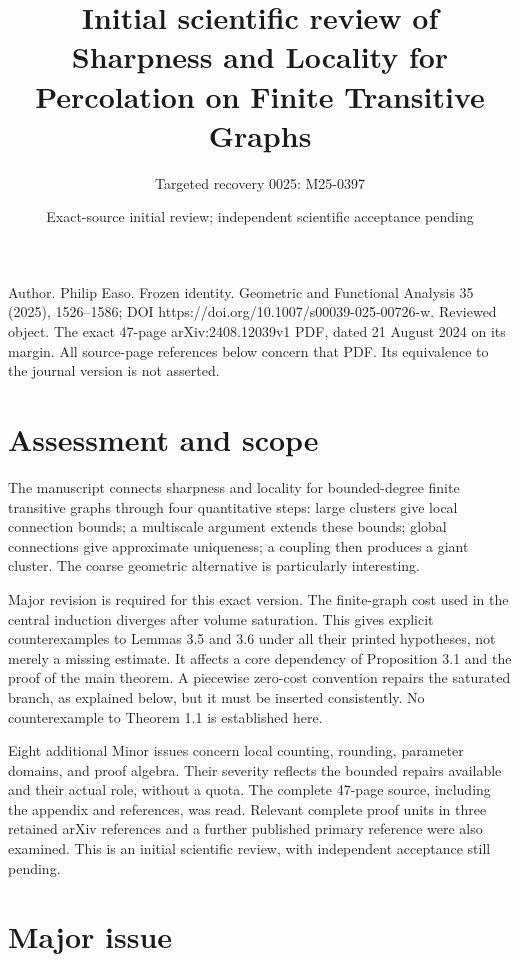 \documentclass[10pt]{article}
\title{Initial scientific review of
Sharpness and Locality for Percolation
on Finite Transitive Graphs}
\author{Targeted recovery 0025: M25-0397}
\date{Exact-source initial review; independent scientific acceptance pending}
\begin{document}
\maketitle
Author. Philip Easo. Frozen identity. Geometric and Functional Analysis 35 (2025), 1526–1586; DOI https://doi.org/10.1007/s00039-025-00726-w. Reviewed object. The exact 47-page arXiv:2408.12039v1 PDF, dated 21 August 2024 on its margin. All source-page references below concern that PDF. Its equivalence to the journal version is not asserted.\par
\section*{Assessment and scope}
The manuscript connects sharpness and locality for bounded-degree finite transitive graphs through four quantitative steps: large clusters give local connection bounds; a multiscale argument extends these bounds; global connections give approximate uniqueness; a coupling then produces a giant cluster. The coarse geometric alternative is particularly interesting.\par
Major revision is required for this exact version. The finite-graph cost used in the central induction diverges after volume saturation. This gives explicit counterexamples to Lemmas 3.5 and 3.6 under all their printed hypotheses, not merely a missing estimate. It affects a core dependency of Proposition 3.1 and the proof of the main theorem. A piecewise zero-cost convention repairs the saturated branch, as explained below, but it must be inserted consistently. No counterexample to Theorem 1.1 is established here.\par
Eight additional Minor issues concern local counting, rounding, parameter domains, and proof algebra. Their severity reflects the bounded repairs available and their actual role, without a quota. The complete 47-page source, including the appendix and references, was read. Relevant complete proof units in three retained arXiv references and a further published primary reference were also examined. This is an initial scientific review, with independent acceptance still pending.\par
\section*{Major issue}
\end{document}
